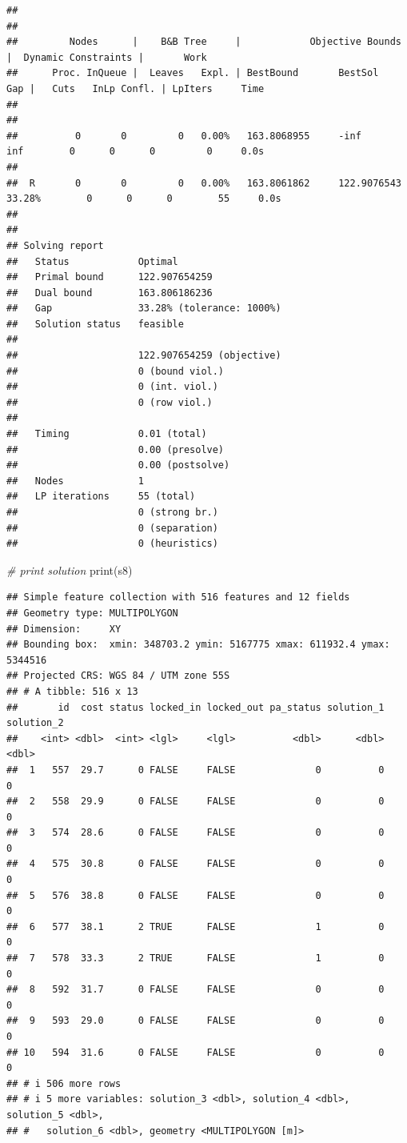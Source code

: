 \documentclass[
  12pt,
]{book}
\newenvironment{Shaded}{\begin{snugshade}}{\end{snugshade}}
\newcommand{\CommentTok}[1]{\textcolor[rgb]{0.56,0.35,0.01}{\textit{#1}}}
\newcommand{\FunctionTok}[1]{\textcolor[rgb]{0.00,0.00,0.00}{#1}}
\newcommand{\NormalTok}[1]{#1}
\begin{document}
\begin{verbatim}
## 
## 
##         Nodes      |    B&B Tree     |            Objective Bounds              |  Dynamic Constraints |       Work      
##      Proc. InQueue |  Leaves   Expl. | BestBound       BestSol              Gap |   Cuts   InLp Confl. | LpIters     Time
## 
## 
##          0       0         0   0.00%   163.8068955     -inf                 inf        0      0      0         0     0.0s
## 
##  R       0       0         0   0.00%   163.8061862     122.9076543       33.28%        0      0      0        55     0.0s
## 
## 
## Solving report
##   Status            Optimal
##   Primal bound      122.907654259
##   Dual bound        163.806186236
##   Gap               33.28% (tolerance: 1000%)
##   Solution status   feasible
## 
##                     122.907654259 (objective)
##                     0 (bound viol.)
##                     0 (int. viol.)
##                     0 (row viol.)
## 
##   Timing            0.01 (total)
##                     0.00 (presolve)
##                     0.00 (postsolve)
##   Nodes             1
##   LP iterations     55 (total)
##                     0 (strong br.)
##                     0 (separation)
##                     0 (heuristics)
\end{verbatim}

\begin{Shaded}
\begin{Highlighting}[]
\CommentTok{\# print solution}
\FunctionTok{print}\NormalTok{(s8)}
\end{Highlighting}
\end{Shaded}

\begin{verbatim}
## Simple feature collection with 516 features and 12 fields
## Geometry type: MULTIPOLYGON
## Dimension:     XY
## Bounding box:  xmin: 348703.2 ymin: 5167775 xmax: 611932.4 ymax: 5344516
## Projected CRS: WGS 84 / UTM zone 55S
## # A tibble: 516 x 13
##       id  cost status locked_in locked_out pa_status solution_1 solution_2
##    <int> <dbl>  <int> <lgl>     <lgl>          <dbl>      <dbl>      <dbl>
##  1   557  29.7      0 FALSE     FALSE              0          0          0
##  2   558  29.9      0 FALSE     FALSE              0          0          0
##  3   574  28.6      0 FALSE     FALSE              0          0          0
##  4   575  30.8      0 FALSE     FALSE              0          0          0
##  5   576  38.8      0 FALSE     FALSE              0          0          0
##  6   577  38.1      2 TRUE      FALSE              1          0          0
##  7   578  33.3      2 TRUE      FALSE              1          0          0
##  8   592  31.7      0 FALSE     FALSE              0          0          0
##  9   593  29.0      0 FALSE     FALSE              0          0          0
## 10   594  31.6      0 FALSE     FALSE              0          0          0
## # i 506 more rows
## # i 5 more variables: solution_3 <dbl>, solution_4 <dbl>, solution_5 <dbl>,
## #   solution_6 <dbl>, geometry <MULTIPOLYGON [m]>
\end{verbatim}
\end{document}
